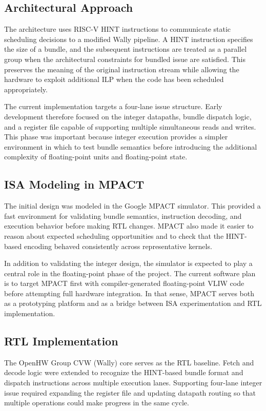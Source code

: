 \documentclass[conference,a4paper]{IEEEtran}
\begin{document}
\subsection{Architectural Approach}

The architecture uses RISC-V HINT instructions to communicate static scheduling decisions to a modified Wally pipeline. A HINT instruction specifies the size of a bundle, and the subsequent instructions are treated as a parallel group when the architectural constraints for bundled issue are satisfied. This preserves the meaning of the original instruction stream while allowing the hardware to exploit additional ILP when the code has been scheduled appropriately.

The current implementation targets a four-lane issue structure. Early development therefore focused on the integer datapaths, bundle dispatch logic, and a register file capable of supporting multiple simultaneous reads and writes. This phase was important because integer execution provides a simpler environment in which to test bundle semantics before introducing the additional complexity of floating-point units and floating-point state.

\subsection{ISA Modeling in MPACT}

The initial design was modeled in the Google MPACT simulator. This provided a fast environment for validating bundle semantics, instruction decoding, and execution behavior before making RTL changes. MPACT also made it easier to reason about expected scheduling opportunities and to check that the HINT-based encoding behaved consistently across representative kernels.

In addition to validating the integer design, the simulator is expected to play a central role in the floating-point phase of the project. The current software plan is to target MPACT first with compiler-generated floating-point VLIW code before attempting full hardware integration. In that sense, MPACT serves both as a prototyping platform and as a bridge between ISA experimentation and RTL implementation.

\subsection{RTL Implementation}

The OpenHW Group CVW (Wally) core serves as the RTL baseline. Fetch and decode logic were extended to recognize the HINT-based bundle format and dispatch instructions across multiple execution lanes. Supporting four-lane integer issue required expanding the register file and updating datapath routing so that multiple operations could make progress in the same cycle.
\end{document}
